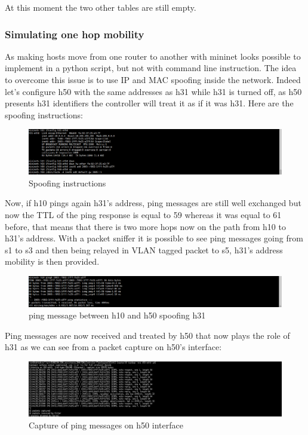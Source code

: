 \documentclass{article}
\begin{document}
At this moment the two other tables are still empty.

\subsubsection{Simulating one hop mobility}

As making hosts move from one router to another with mininet looks
possible to implement in a python script, but not with command line
instruction. The idea to overcome this issue is to use IP and MAC
spoofing inside the network. Indeed let's configure h50 with the same
addresses as h31 while h31 is turned off, as h50 presents h31
identifiers the controller will treat it as if it was h31.
Here are the spoofing instructions: 

\begin{figure}[h!]
  \centering
    \includegraphics[trim = 0mm 0mm 237mm 0mm,clip,scale=0.5]{reportPictures/h50_spoofs_h31.png}
  \caption{Spoofing instructions}
\end{figure}

Now, if h10 pings again h31's address, ping messages are still well
exchanged but now the TTL of the ping response is equal to 59 whereas
it was equal to 61 before, that means that there is two more hops now
on the path from h10 to h31's address. With a packet sniffer it is
possible to see ping messages going from s1 to s3 and then being
relayed in VLAN tagged packet to s5, h31's address mobility is then
provided.

\begin{figure}[h!]
  \centering
    \includegraphics[trim = 0mm 0mm 237mm 0mm,clip,scale=0.5]{reportPictures/h10_ping_h31spoofed.png}
  \caption{ping message between h10 and h50 spoofing h31}
\end{figure}


Ping messages are now received and treated by h50 that now plays the
role of h31 as we can see from a packet capture on h50's interface:

\begin{figure}[h!]
  \centering
    \includegraphics[trim = 0mm 0mm 237mm 0mm,clip,scale=0.5]{reportPictures/h50_tcpdump.png}
  \caption{Capture of ping messages on h50 interface}
\end{figure}
\end{document}
